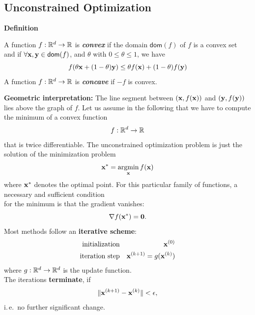 \subsection{Unconstrained Optimization}
 
 \textbf{Definition}

    A function $f: \mathbb{R}^d \rightarrow \mathbb{R}$ is \textbf{\emph{convex}} if the domain $\mathsf{dom}(f)$ of $f$ is a convex set \\
    and if $\forall \bm{\mathrm{x}}, \bm{\mathrm{y}} \in \mathsf{dom}(f)$, and $\theta$ with $0 \leq \theta \leq 1$, we have
    \begin{displaymath}
      f(\theta \bm{\mathrm{x}} + (1-\theta) \bm{\mathrm{y}}) \leq \theta f(\bm{\mathrm{x}}) + (1-\theta) f(\bm{\mathrm{y}})
    \end{displaymath}
A function $f: \mathbb{R}^d \rightarrow \mathbb{R}$ is   \textbf{\emph{concave}} if $-f$ is convex.
   
 \textbf{Geometric interpretation:} The line segment between $(\bm{\mathrm{x}}, f(\bm{\mathrm{x}}))$ and $(\bm{\mathrm{y}}, f(\bm{\mathrm{y}}))$ lies above the graph of $f$. Let us assume in the following that we have to compute the minimum of a convex function
  \begin{displaymath}
    f: \mathbb{R}^d \rightarrow \mathbb{R}
  \end{displaymath}
  that is twice differentiable. The unconstrained optimization problem is just the solution of the minimization problem
  \begin{displaymath}
    \bm{\mathrm{x}}^* = \operatorname*{argmin}_{\bm{\mathrm{x}}} f(\bm{\mathrm{x}})
  \end{displaymath}
  where $\bm{\mathrm{x}}^*$ denotes the optimal point.  For this particular family of functions, a necessary and sufficient condition \\
  for the minimum is that the gradient vanishes:
  \begin{displaymath}
    \nabla f(\bm{\mathrm{x}}^*) = \bm{\mathrm{0}}.
  \end{displaymath}
 Most methods follow an \textbf{iterative scheme}:
  \begin{eqnarray*}
    \mbox{initialization} & & \bm{\mathrm{x}} ^{(0)}\\
    \mbox{iteration step} & & \bm{\mathrm{x}}^{(k+1)}= g(\bm{\mathrm{x}}^{(k)}) 
  \end{eqnarray*}
  where $g: \mathbb{R}^d\rightarrow \mathbb{R}^d$ is the update function. \\   

  The iterations  \textbf{terminate}, if 
  \begin{displaymath}
    \|\bm{\mathrm{x}}^{(k+1)} - \bm{\mathrm{x}}^{(k)}\| < \epsilon,
  \end{displaymath}
  i.\,e.\ no further significant change.
 

